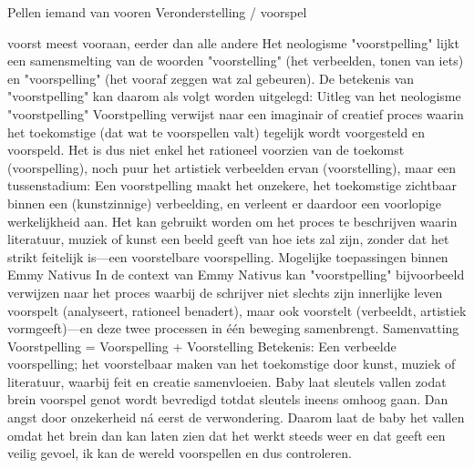 Pellen iemand van vooren
Veronderstelling / voorspel

voorst
meest vooraan, eerder dan alle andere
Het neologisme "voorstpelling" lijkt een samensmelting van de woorden "voorstelling" (het verbeelden, tonen van iets) en "voorspelling" (het vooraf zeggen wat zal gebeuren). De betekenis van "voorstpelling" kan daarom als volgt worden uitgelegd:
Uitleg van het neologisme "voorstpelling"
Voorstpelling verwijst naar een imaginair of creatief proces waarin het toekomstige (dat wat te voorspellen valt) tegelijk wordt voorgesteld en voorspeld. Het is dus niet enkel het rationeel voorzien van de toekomst (voorspelling), noch puur het artistiek verbeelden ervan (voorstelling), maar een tussenstadium:
Een voorstpelling maakt het onzekere, het toekomstige zichtbaar binnen een (kunstzinnige) verbeelding, en verleent er daardoor een voorlopige werkelijkheid aan. Het kan gebruikt worden om het proces te beschrijven waarin literatuur, muziek of kunst een beeld geeft van hoe iets zal zijn, zonder dat het strikt feitelijk is—een voorstelbare voorspelling.
Mogelijke toepassingen binnen Emmy Nativus
In de context van Emmy Nativus kan "voorstpelling" bijvoorbeeld verwijzen naar het proces waarbij de schrijver niet slechts zijn innerlijke leven voorspelt (analyseert, rationeel benadert), maar ook voorstelt (verbeeldt, artistiek vormgeeft)—en deze twee processen in één beweging samenbrengt.
Samenvatting
Voorstpelling = Voorspelling + Voorstelling
Betekenis: Een verbeelde voorspelling; het voorstelbaar maken van het toekomstige door kunst, muziek of literatuur, waarbij feit en creatie samenvloeien.
Baby laat sleutels vallen zodat brein voorspel genot wordt bevredigd totdat sleutels ineens omhoog gaan. Dan angst door onzekerheid ná eerst de verwondering. Daarom laat de baby het vallen omdat het brein dan kan laten zien dat het werkt steeds weer en dat geeft een veilig gevoel, ik kan de wereld voorspellen en dus controleren.
